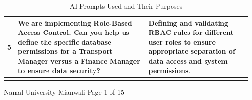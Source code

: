 \documentclass[12pt,a4paper]{report}
\begin{document}
\begin{longtable}{|c|p{7cm}|p{6cm}|}
5 & We are implementing Role-Based Access Control. Can you help us define the specific database permissions for a Transport Manager versus a Finance Manager to ensure data security? & Defining and validating RBAC rules for different user roles to ensure appropriate separation of data access and system permissions. \\
\hline

\caption{AI Prompts Used and Their Purposes}
\end{longtable}

\vfill

\begin{center}
Namal University Mianwali \textbar{} Page 1 of 15
\end{center}
\end{document}
